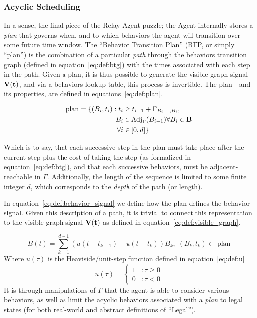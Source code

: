 \documentclass{report}
\begin{document}
\subsubsection{Acyclic Scheduling}
\label{seq:def:plan}

In a sense, the final piece of the Relay Agent puzzle; the Agent internally stores a \emph{plan} that governs when, and to which behaviors the agent will transition over some future time window.
The ``Behavior Transition Plan'' (BTP, or simply ``plan'') is the combination of a particular \emph{path} through the behaviors transition graph (defined in equation~\eqref{eq:def:btg}) with the times associated with each step in the path.
Given a plan, it is thus possible to generate the visible graph signal $\bf{V}(t)$, and via a behaviors lookup-table, this process is invertible.
The plan---and its properties, are defined in equations~\eqref{eq:def:plan}.

\begin{align}\label{eq:def:plan}
	\mbox{plan} = \{(B_i, t_i) : t_{i} &\geq t_{i-1} + \Gamma_{B_{i-1},B_i},\\
	B_i &\in \mbox{Adj}_\Gamma(B_{i-1}) \forall B_i \in \bf{B}\\
	\forall i &\in [0, d]\}
\end{align}

Which is to say, that each successive step in the plan must take place after the current step plus the cost of taking the step (as formalized in equation~\eqref{eq:def:btg}), and that each successive behaviors, must be adjacent-reachable in $\Gamma$.
Additionally, the length of the sequence is limited to some finite integer $d$, which corresponds to the \emph{depth} of the path (or length).

In equation~\eqref{eq:def:behavior_signal} we define how the plan defines the behavior signal.
Given this description of a path, it is trivial to connect this representation to the visible graph signal $\bf{V}(t)$ as defined in equation~\eqref{eq:def:visible_graph}.

\begin{equation}\label{eq:def:behavior_signal}
	B(t) = \sum_{k=1}^{d-1} (u(t - t_{k-1}) - u(t - t_k)) B_k, \; (B_k, t_k) \in \; \mbox{plan}
\end{equation}
Where $u(\tau)$ is the Heaviside/unit-step function defined in equation~\eqref{eq:def:u}
\begin{equation}\label{eq:def:u}
	u(\tau) = \left\{
		\begin{array}{lr}
			1 & : \tau \geq 0\\
			0 & : \tau < 0
		\end{array}
		\right.
	\end{equation}
It is through manipulations of $\Gamma$ that the agent is able to consider various behaviors, as well as limit the acyclic behaviors associated with a \emph{plan} to legal states (for both real-world and abstract definitions of ``Legal'').
\end{document}
